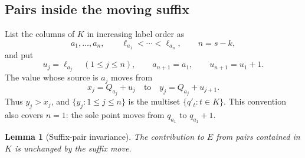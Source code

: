 \documentclass[10pt]{article}
\newtheorem{lemma}{Lemma}[section]
\begin{document}
\subsection{Pairs inside the moving suffix}

List the columns of \(K\) in increasing label order as
\[
  a_1,\ldots,a_n,
  \qquad
  \ell_{a_1}<\cdots<\ell_{a_n},
  \qquad n=s-k,
\]
and put
\[
  u_j=\ell_{a_j}\quad(1\le j\le n),
  \qquad
  a_{n+1}=a_1,
  \qquad
  u_{n+1}=u_1+1.
\]
The value whose source is \(a_j\) moves from
\begin{equation}
  x_j=Q_{a_j}+u_j
  \quad\text{to}\quad
  y_j=Q_{a_j}+u_{j+1}.
  \label{eq:lifted-motion}
\end{equation}
Thus \(y_j>x_j\), and \(\{y_j:1\le j\le n\}\) is the multiset
\(\{q'_t:t\in K\}\).  This convention also covers \(n=1\): the sole point
moves from \(q_{a_1}\) to \(q_{a_1}+1\).

\begin{lemma}[Suffix-pair invariance]
\label{lem:suffix-pairs}
The contribution to \(E\) from pairs contained in \(K\) is unchanged by the
suffix move.
\end{lemma}
\end{document}
